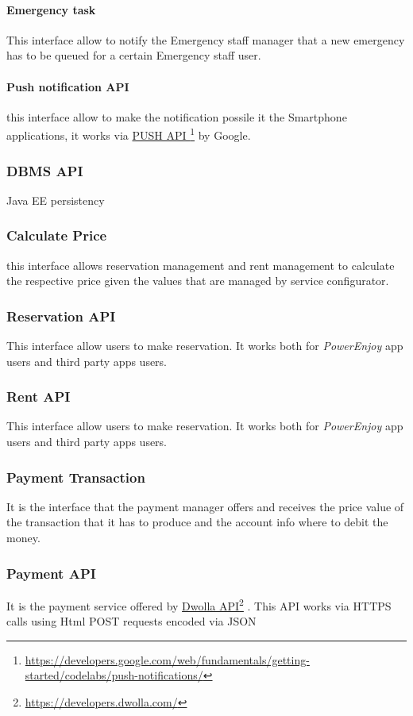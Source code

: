 \documentclass[english]{article}
\newcommand\fnurl[2]{%
	\href{#2}{#1}\footnote{\url{#2}}%
}
\newcommand{\powerenjoy}{\textit{PowerEnjoy }}
\begin{document}
		\paragraph{Emergency task}
		This interface allow to notify the Emergency staff manager that a new emergency has to be queued for a certain Emergency staff user.
		\paragraph{Push notification API}
		this interface allow to make the notification possile it the Smartphone applications, it works via \fnurl{PUSH API }{https://developers.google.com/web/fundamentals/getting-started/codelabs/push-notifications/}by Google.
	\subsubsection*{DBMS API}
	Java EE persistency
	\subsubsection*{Calculate Price}
	this interface allows reservation management and rent management to calculate the respective price given the values that are managed by service configurator.	
	\subsubsection*{Reservation API}
	This interface allow users to make reservation. It works both for \powerenjoy app users and third party apps users.	
	\subsubsection*{Rent API}
	This interface allow users to make reservation. It works both for \powerenjoy app users and third party apps users.
	\subsubsection*{Payment Transaction}
	It is the interface that the payment manager offers and receives the price value of the transaction that it has to produce and the account info where to debit the money.
	\subsubsection*{Payment API}
	It is the payment service offered by \fnurl{Dwolla API}{https://developers.dwolla.com/}. This API works via HTTPS calls using Html POST requests encoded via JSON
\end{document}
